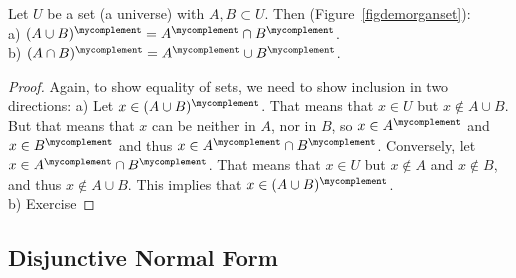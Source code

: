 \begin{thm}
Let $U$ be a set (a universe) with $A,B\subset U$.
Then (Figure~\ref{figdemorganset}):\\
a) $(A\cup B)^\mycomplement=A^\mycomplement\cap B^\mycomplement$.\\
b) $(A\cap B)^\mycomplement=A^\mycomplement\cup B^\mycomplement$.
\end{thm}
\begin{proof}
Again, to show equality of sets, we need to show inclusion in two directions:
a) Let $x\in (A\cup B)^\mycomplement$. That means that $x\in U$ but $x\not\in
A\cup B$. But that means that $x$ can be neither in $A$, nor in $B$, so
$x\in A^\mycomplement$ and $x\in B^\mycomplement$ and thus $x\in
A^\mycomplement\cap B^\mycomplement$.
Conversely, let $x\in A^\mycomplement\cap B^\mycomplement$.
That means that $x\in U$ but $x\not\in A$ and
$x\not\in B$, and thus $x\not\in A\cup B$. This implies that
$x\in(A\cup B)^\mycomplement$.\\
b) Exercise
\end{proof}

\subsection{Disjunctive Normal Form}

